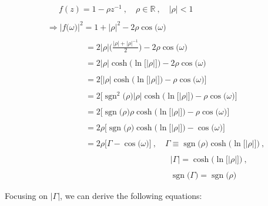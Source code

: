 \documentclass{article}
\DeclareMathOperator{\sgn}{sgn}
\begin{document}
\begin{align*}
    & \quad \ \ f(z) = 1 - \rho z^{-1} \ , \quad \rho \in \mathbb{R} \ , \quad \big|\rho\big| < 1 \\ \\
    & \Rightarrow \Big|f\big(\omega\big)\Big|^{2} = 1 + \big|\rho\big|^{2} - 2\rho\cos\big(\omega\big) \\ \\
    & \quad \quad \quad \quad \ \ \ = 2\big|\rho\big|\Bigg(\frac{\big|\rho\big| + \big|\rho\big|^{-1}}{2}\Bigg) - 2\rho\cos\big(\omega\big) \\ \\
    & \quad \quad \quad \quad \ \ \ = 2\big|\rho\big|\cosh\Big(\ln\big[\big|\rho\big|\big]\Big) - 2\rho\cos\big(\omega\big) \\ \\
    & \quad \quad \quad \quad \ \ \ = 2\Bigg[\big|\rho\big|\cosh\Big(\ln\big[\big|\rho\big|\big]\Big) - \rho\cos\big(\omega\big)\Bigg] \\ \\
    & \quad \quad \quad \quad \ \ \ = 2\Bigg[\sgn^{2}\big(\rho\big)\big|\rho\big|\cosh\Big(\ln\big[\big|\rho\big|\big]\Big) - \rho\cos\big(\omega\big)\Bigg] \\ \\
    & \quad \quad \quad \quad \ \ \ = 2\Bigg[\sgn\big(\rho\big)\rho\cosh\Big(\ln\big[\big|\rho\big|\big]\Big) - \rho\cos\big(\omega\big)\Bigg] \\ \\
    & \quad \quad \quad \quad \ \ \ = 2\rho\Bigg[\sgn\big(\rho\big)\cosh\Big(\ln\big[\big|\rho\big|\big]\Big) - \cos\big(\omega\big)\Bigg] \\ \\
    & \quad \quad \quad \quad \ \ \ = 2\rho\bigg[\Gamma - \cos\big(\omega\big)\bigg] \ , \quad \Gamma \equiv \sgn\big(\rho\big)\cosh\Big(\ln\big[\big|\rho\big|\big]\Big) \ , \\ \\
    & \quad \quad \quad \quad \quad \quad \quad \quad \quad \quad \quad \quad \quad \quad \quad \big|\Gamma\big| = \cosh\Big(\ln\big[\big|\rho\big|\big]\Big) \ , \\ \\
    & \quad \quad \quad \quad \quad \quad \quad \quad \quad \quad \quad \quad \quad \quad \quad \sgn\big(\Gamma\big) = \sgn\big(\rho\big)
  \end{align*}\newline

Focusing on $\big|\Gamma\big|$, we can derive the following equations:
\end{document}
